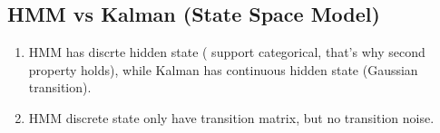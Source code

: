 \subsection{HMM vs Kalman (State Space Model)}
\begin{enumerate}
\item HMM has discrte hidden state {\color{blue}( support categorical, that's why second property holds)}, while Kalman has continuous hidden state (Gaussian transition).
\item HMM discrete state only have transition matrix, but no transition noise.
\end{enumerate}
